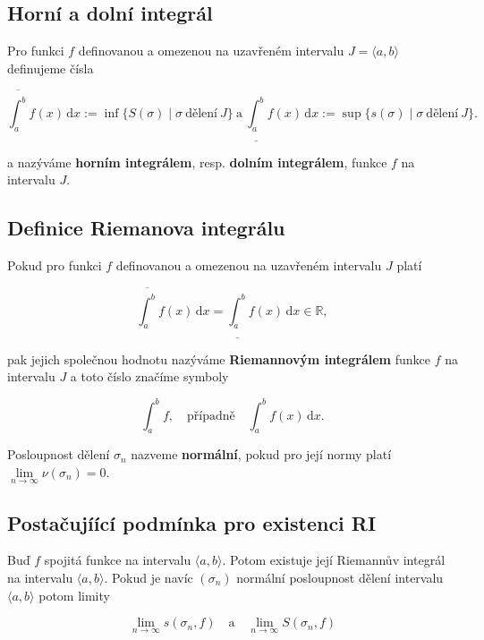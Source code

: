 \documentclass{szzclass}
\begin{document}
\subsection{Horní a dolní integrál}
Pro funkci $f$ definovanou a omezenou na uzavřeném intervalu $J=\langle a,b \rangle$ definujeme čísla

\begin{equation*}
\overline{\int_a^b} f(x) \,\mathrm{d}x := \inf\{ S(\sigma) \mid \sigma \ \text{dělení} \ J \} \ \text{a} \ \underline{\int_a^b} f(x) \,\mathrm{d}x := \sup\{ s(\sigma) \mid \sigma \ \text{dělení} \ J \}.\end{equation*}

a nazýváme \textbf{horním integrálem}, resp. \textbf{dolním integrálem}, funkce $f$ na intervalu $J$.

\newpage

\subsection{Definice Riemanova integrálu}

Pokud pro funkci $f$ definovanou a omezenou na uzavřeném intervalu $J$ platí

\begin{equation*}
\overline{\int_a^b} f(x)\,\mathrm{d}x = \underline{\int_a^b} f(x) \,\mathrm{d}x \in \mathbb{R},\end{equation*}

pak jejich společnou hodnotu nazýváme \textbf{Riemannovým integrálem}
funkce $f$ na intervalu $J$ a toto číslo značíme symboly

\begin{equation*}
\int_a^b f, \quad \text{případně} \quad \int_a^b f(x)\,\mathrm{d}x.\end{equation*}


Posloupnost dělení $\sigma_n$ nazveme \textbf{normální},
pokud pro její normy platí $\lim\limits_{n\to\infty} \nu(\sigma_n) = 0.$


\subsection{Postačujíící podmínka pro existenci RI}

Buď $f$ spojitá funkce na intervalu $\langle a,b \rangle$.
Potom existuje její Riemannův integrál na intervalu
$\langle a,b \rangle$. Pokud je navíc $(\sigma_n)$ normální
posloupnost dělení intervalu $\langle a,b \rangle$
potom limity

\begin{equation*}
\lim_{n\to\infty} s(\sigma_n, f) \quad \text{a} \quad \lim_{n\to\infty} S(\sigma_n,f)\end{equation*}
\end{document}
